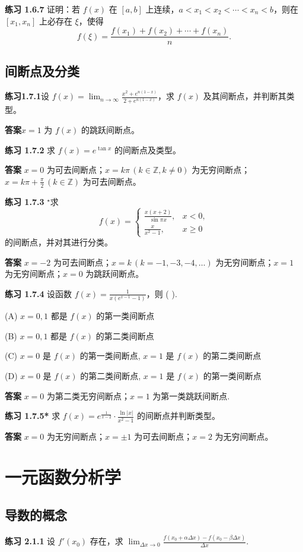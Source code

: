 \documentclass[lang=cn,10pt]{elegantbook}
\begin{document}
\textbf{练习 1.6.7} 证明：若 $f(x)$ 在 $[a,b]$ 上连续，$a < x_1 < x_2 < \cdots < x_n < b$，则在 $[x_1, x_n]$ 上必存在 $\xi$，使得
\[
f(\xi) = \frac{f(x_1) + f(x_2) + \cdots + f(x_n)}{n}.
\]
\section{间断点及分类}
\textbf{练习1.7.1}设 $f(x) = \lim_{n \to \infty} \frac{x^2 + e^{n(1-x)}}{2 + e^{n(1-x)}}$，求 $f(x)$ 及其间断点，并判断其类型。

\textbf{答案}$x=1$ 为 $f(x)$ 的跳跃间断点。


\textbf{练习 1.7.2} 求 $f(x) = e^{\tan x}$ 的间断点及类型。

\textbf{答案} $x = 0$ 为可去间断点；$x = k\pi \, (k \in \mathbb{Z}, k \neq 0)$ 为无穷间断点；$x = k\pi + \frac{\pi}{2} \, (k \in \mathbb{Z})$ 为可去间断点。


\textbf{练习 1.7.3} ${}^{\star }$求 \[f(x) = \begin{cases} 
\frac{x(x+2)}{\sin \pi x}, & x < 0, \\
\frac{x}{x^2 - 1}, & x \geq 0 
\end{cases}\] 的间断点，并对其进行分类。

\textbf{答案} $x = -2$ 为可去间断点；$x = k \, (k = -1, -3, -4, \ldots)$ 为无穷间断点；$x = 1$ 为无穷间断点；$x = 0$ 为跳跃间断点。


\textbf{练习 1.7.4} 设函数 $f(x) = \frac{1}{x(e^{x-1} - 1)}$，则 ( ).

(A) $x = 0, 1$ 都是 $f(x)$ 的第一类间断点

(B) $x = 0, 1$ 都是 $f(x)$ 的第二类间断点

(C) $x = 0$ 是 $f(x)$ 的第一类间断点, $x = 1$ 是 $f(x)$ 的第二类间断点

(D) $x = 0$ 是 $f(x)$ 的第二类间断点, $x = 1$ 是 $f(x)$ 的第一类间断点

\textbf{答案} $x = 0$ 为第二类无穷间断点；$x = 1$ 为第一类跳跃间断点.


\textbf{练习 1.7.5*} 求 $f(x) = e^{\frac{1}{x-2}} \cdot \frac{\ln|x|}{x^2 - 1}$ 的间断点并判断类型。

\textbf{答案} $x = 0$ 为无穷间断点；$x = \pm 1$ 为可去间断点；$x = 2$ 为无穷间断点。
\chapter{一元函数分析学}


\section{导数的概念}
\textbf{练习 2.1.1} 设 $f'(x_0)$ 存在，求 $\lim_{\Delta x \to 0} \frac{f(x_0 + \alpha \Delta x) - f(x_0 - \beta \Delta x)}{\Delta x}$.
\end{document}
